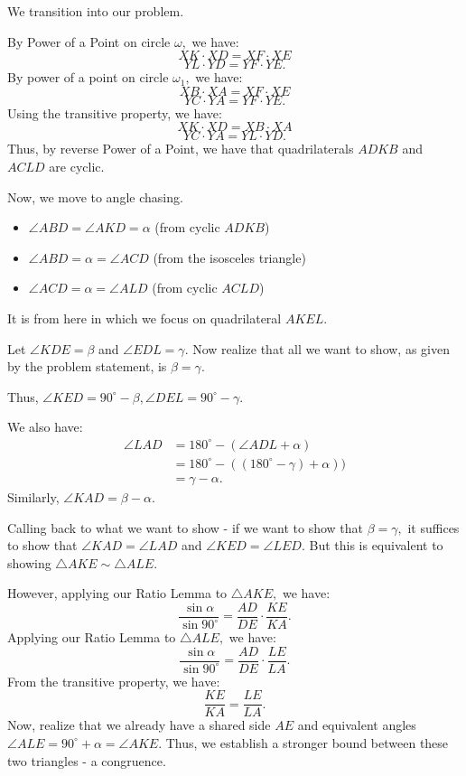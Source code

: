 \begin{enumerate}
 We transition into our problem.

 By Power of a Point on circle $\omega,$ we have:
 \[XK\cdot XD=XF\cdot XE\]
 \[YL\cdot YD=YF\cdot YE.\]By power of a point on circle $\omega_1,$ we have:
 \[XB\cdot XA=XF\cdot XE\]
 \[YC\cdot YA=YF\cdot YE.\]Using the transitive property, we have:
 \[XK\cdot XD=XB\cdot XA\]
 \[YC\cdot YA=YL\cdot YD.\]Thus, by reverse Power of a Point, we have that quadrilaterals $ADKB$ and $ACLD$ are cyclic.

 Now, we move to angle chasing.

 
            \begin{itemize}
        \item $\angle{ABD}=\angle{AKD}=\alpha$ (from cyclic $ADKB$)
            \end{itemize}
            
            \begin{itemize}
        \item $\angle{ABD}=\alpha=\angle{ACD}$ (from the isosceles triangle)
            \end{itemize}
            
            \begin{itemize}
        \item $\angle{ACD}=\alpha=\angle{ALD}$ (from cyclic $ACLD$)
            \end{itemize}
            It is from here in which we focus on quadrilateral $AKEL.$ 

 Let $\angle KDE=\beta$ and $\angle EDL=\gamma.$ Now realize that all we want to show, as given by the problem statement, is $\beta=\gamma.$

 Thus, $\angle{KED}=90^\circ-\beta, \angle{DEL}=90^\circ-\gamma.$

 We also have:\begin{align*}\angle LAD&=180^\circ-(\angle ADL+\alpha)\\&=180^\circ-((180^\circ-\gamma)+\alpha))\\&=\gamma-\alpha.\end{align*}
Similarly, $\angle{KAD}=\beta-\alpha.$ 

 Calling back to what we want to show - if we want to show that $\beta=\gamma,$ it suffices to show that $\angle KAD=\angle LAD$ and $\angle KED=\angle LED.$ But this is equivalent to showing $\triangle{AKE}\sim\triangle{ALE}.$

 However, applying our Ratio Lemma to $\triangle{AKE},$ we have:
 \[\frac{\sin\alpha}{\sin 90^\circ}=\frac{AD}{DE}\cdot\frac{KE}{KA}.\]Applying our Ratio Lemma to $\triangle{ALE},$ we have:
 \[\frac{\sin\alpha}{\sin 90^\circ}=\frac{AD}{DE}\cdot\frac{LE}{LA}.\]From the transitive property, we have:
 \[\frac{KE}{KA}=\frac{LE}{LA}.\]Now, realize that we already have a shared side $AE$ and equivalent angles $\angle{ALE}=90^\circ+\alpha=\angle{AKE}.$ Thus, we establish a stronger bound between these two triangles - a congruence.


\end{enumerate}
